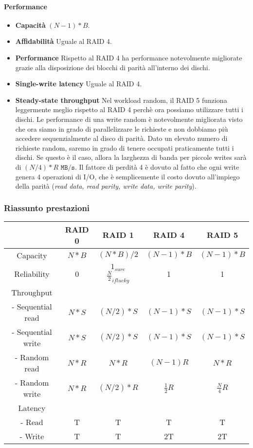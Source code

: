 \documentclass[12pt, letterpaper]{article}
\begin{document}
				\paragraph{Performance}
					\begin{itemize}
						\item \textbf{Capacità} $(N-1)*B$.
						\item \textbf{Affidabilità} Uguale al RAID 4.
						\item \textbf{Performance} Rispetto al RAID 4 ha performance notevolmente migliorate grazie alla disposizione dei blocchi di parità all'interno dei dischi.
						\item \textbf{Single-write latency} Uguale al RAID 4.
						\item \textbf{Steady-state throughput} Nel workload random, il RAID 5 funziona leggermente meglio rispetto al RAID 4 perchè ora possiamo utilizzare tutti i dischi. Le performance di una write random è notevolmente migliorata visto che ora siamo in grado di parallelizzare le richieste e non dobbiamo più accedere sequenzialmente al disco di parità. Dato un elevato numero di richieste random, saremo in grado di tenere occupati praticamente tutti i dischi. Se questo è il caso, allora la larghezza di banda per piccole writes sarà di $(N/4)*R \texttt{ MB/s}$. Il fattore di perdità 4 è dovuto al fatto che ogni write genera 4 operazioni di I/O, che è semplicemente il costo dovuto all'impiego della parità (\textit{read data, read parity, write data, write parity}). 
					\end{itemize}
			
			\subsubsection{Riassunto prestazioni}
				\begin{center}				
				\begin{tabular}{ccccc}
					& \textbf{RAID 0} & \textbf{RAID 1} & \textbf{RAID 4} & \textbf{RAID 5}\\
					\hline
					Capacity & $N*B$ & $(N*B)/2$ & $(N-1)*B$ & $(N-1)*B$\\		
					\hline
					Reliability & 0 & $1_{sure}$ $\frac{N}{2}_{if lucky}$ & 1 & 1 \\
					\hline
					Throughput &&&&\\
					- Sequential read & $N*S$ & $(N/2)*S$ & $(N-1)*S$ & $(N-1)*S$\\
					- Sequential write & $N*S$ & $(N/2)*S$ & $(N-1)*S$ & $(N-1)*S$\\
					- Random read & $N*R$ & $N*R$ & $(N-1)R$ & $N*R$\\
					- Random write & $N*R$ & $(N/2)*R$ & $\frac{1}{2}R$ & $\frac{N}{4}R$\\
					\hline
					Latency \\
					- Read & T & T & T & T \\
					- Write & T & T & 2T & 2T
				\end{tabular}
				\end{center}
		
\end{document}
